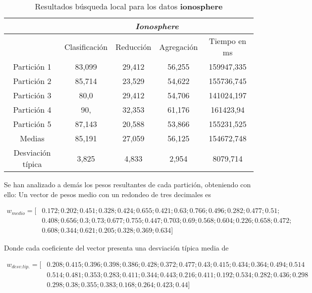 \begin{table}[H]
  \centering
  \begin{tabular}{|c|c|c|c|c|}
    \hline
    & \multicolumn{4}{|c|}{\textit{Ionosphere}}  \\
    \hline
    &	Clasificación &		Reducción	
    &	Agregación	&	Tiempo en ms \\
    \hline
    Partición 1	& 83,099	 & 29,412	& 56,255 & 159947,335 \\
    Partición 2 &	85,714	 &23,529 &	54,622&	155736,745 \\
    Partición 3 &	80,0 &	29,412&	54,706 & 141024,197 \\
    Partición 4	& 90, & 32,353  & 61,176  & 161423,94 \\
    Partición 5	 &87,143  & 20,588  & 53,866 & 155231,525 \\
    \hline
    Medias 	 & 85,191  & 27,059  & 56,125 & 154672,748 \\
    \hline
    Desviación típica &	3,825 &	4,833& 2,954 &	8079,714 \\ 
    \hline  
  \end{tabular}
  \caption{Resultados búsqueda local para los datos \textbf{ionosphere}}
  \label{table:BL_ionosphere}
\end{table}

Se han analizado a demás los pesos resultantes de cada partición, obteniendo con ello: 
Un vector de pesos medio con un redondeo de tres decimales es 

\begin{align*}
w_{medio} = [ 
  & 0.172; 0.202; 0.451; 0.328; 0.424; 0.655; 0.421; 0.63; 0.766; 0.496; 0.282; 0.477; 0.51;\\
 & 0.408; 0.656; 0.3; 0.73; 0.677; 0.755; 0.447;
  0.703; 0.69; 0.568; 0.604; 0.226; 0.658; 0.472; \\
 & 0.608; 0.344; 0.621; 0.205; 0.328; 0.369; 0.634
 ]
\end{align*}

Donde cada coeficiente del vector presenta una desviación típica media de 

\begin{align*}
  w_{desv. tip.} = [ 
    & 0.208; 0.415; 0.396; 0.398; 0.386; 0.428; 0.372; 0.477; 0.43; 0.415; 0.434; 0.364; 0.494; 0.514 \\
& 0.514; 0.481; 0.353; 0.283; 0.411; 0.344; 0.443; 0.216; 0.411; 0.192; 0.534; 0.282; 0.436; 0.298 \\
& 0.298; 0.38; 0.355; 0.383; 0.168; 0.264; 0.423; 0.44
   ]
  \end{align*}

